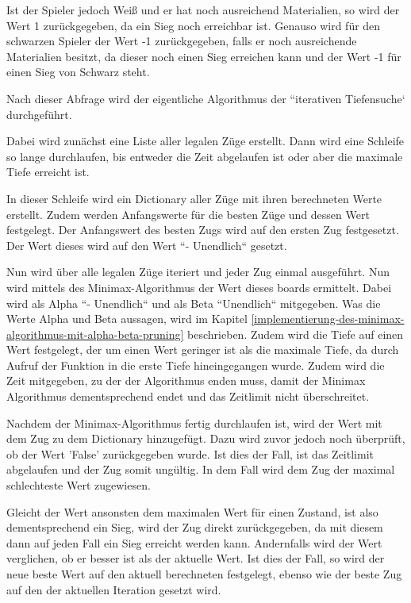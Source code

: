 Ist der Spieler jedoch Weiß und er hat noch ausreichend Materialien, so
wird der Wert 1 zurückgegeben, da ein Sieg noch erreichbar ist. Genauso
wird für den schwarzen Spieler der Wert -1 zurückgegeben, falls er noch
ausreichende Materialien besitzt, da dieser noch einen Sieg erreichen
kann und der Wert -1 für einen Sieg von Schwarz steht.

Nach dieser Abfrage wird der eigentliche Algorithmus der ``iterativen
Tiefensuche` durchgeführt.

    Dabei wird zunächst eine Liste aller legalen Züge erstellt. Dann wird
eine Schleife so lange durchlaufen, bis entweder die Zeit abgelaufen ist
oder aber die maximale Tiefe erreicht ist.

In dieser Schleife wird ein Dictionary aller Züge mit ihren berechneten
Werte erstellt. Zudem werden Anfangswerte für die besten Züge und dessen
Wert festgelegt. Der Anfangswert des besten Zugs wird auf den ersten Zug
festgesetzt. Der Wert dieses wird auf den Wert ``- Unendlich`` gesetzt.

Nun wird über alle legalen Züge iteriert und jeder Zug einmal ausgeführt. 
Nun wird mittels des Minimax-Algorithmus der Wert dieses boards ermittelt.
Dabei wird als Alpha  ``- Unendlich`` und als Beta ``Unendlich`` mitgegeben. 
Was die Werte Alpha und Beta aussagen, wird im Kapitel \ref{implementierung-des-minimax-algorithmus-mit-alpha-beta-pruning}
beschrieben. Zudem wird die Tiefe auf einen Wert festgelegt, der um einen Wert geringer 
ist als die maximale Tiefe, da durch Aufruf der Funktion in die erste Tiefe 
hineingegangen wurde. Zudem wird die Zeit mitgegeben, zu der der Algorithmus 
enden muss, damit der Minimax Algorithmus dementsprechend endet und das
Zeitlimit nicht überschreitet.

Nachdem der Minimax-Algorithmus fertig durchlaufen ist, wird der Wert
mit dem Zug zu dem Dictionary hinzugefügt. Dazu wird zuvor jedoch noch überprüft, ob der Wert 'False' zurückgegeben wurde. Ist dies der Fall, ist das Zeitlimit abgelaufen und der Zug somit ungültig. In dem Fall wird dem Zug der maximal schlechteste Wert zugewiesen. 

Gleicht der Wert ansonsten dem maximalen Wert für einen Zustand, ist also dementsprechend ein Sieg,
wird der Zug direkt zurückgegeben, da mit diesem dann auf jeden Fall ein
Sieg erreicht werden kann. Andernfalls wird der Wert verglichen, ob er
besser ist als der aktuelle Wert. Ist dies der Fall, so wird der neue
beste Wert auf den aktuell berechneten festgelegt, ebenso wie der beste
Zug auf den der aktuellen Iteration gesetzt wird.


